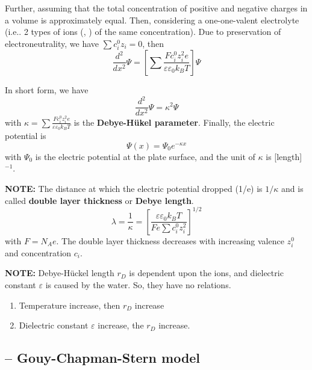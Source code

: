 Further, assuming that the total concentration of positive and
negative charges in a volume is approximately equal. Then, considering
a one-one-valent electrolyte (i.e.. 2 types of ions (,
) of the same concentration). Due to preservation of
electroneutrality, we have $\sum c_i^0 z_i = 0$, then
\begin{equation}
  \label{eq:55}
  \frac{d^2}{dx^2}\Psi =
  \left[\sum
    \frac{Fc_i^0z_i^2e}{\varepsilon \varepsilon_0 k_BT} \right] \Psi
\end{equation}

In short form, we have
\begin{equation}
  \label{eq:56}
  \frac{d^2}{dx^2}\Psi =
  \kappa^2 \Psi  
\end{equation}
with $\kappa = \sum
\frac{Fc_i^0z_i^2e}{\varepsilon \varepsilon_0 k_BT}$ is the
{\bf Debye-H\"ukel parameter}. Finally, the electric potential is
\begin{equation}
  \label{eq:57}
  \Psi(x) = \Psi_0 e^{-\kappa x}
\end{equation}
with $\Psi_0$ is the electric potential at the plate surface, and the
unit of $\kappa$ is [length]$^{-1}$.

{\bf NOTE:} The distance at which the electric potential dropped (1/e)
is $1/\kappa$ and is called {\bf double layer thickness} or
{\bf Debye length}.
\begin{equation}
  \label{eq:39}
  \lambda = \frac{1}{\kappa} = \left[ \frac{\varepsilon \varepsilon_0 k_BT}{Fe\sum c_i^0z_i^2} \right]^{1/2}
\end{equation}
with $F=N_Ae$.  The double layer thickness decreases with increasing
valence $z_i^0$ and concentration $c_i$.

{\bf NOTE:} Debye-H\"uckel length $r_D$ is dependent upon the ions,
and dielectric constant $\varepsilon$ is caused by the water. So, they
have no relations.
\begin{enumerate}
\item Temperature increase, then $r_D$ increase
\item Dielectric constant $\varepsilon$ increase, the $r_D$ increase.
\end{enumerate}

\subsection{-- Gouy-Chapman-Stern model}
\label{sec:gouy-chapman-stern}


